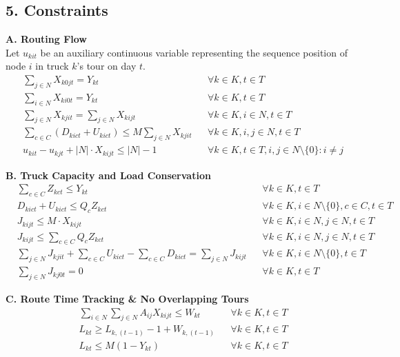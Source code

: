 \documentclass{article}
\begin{document}
\subsection*{5. Constraints}

\textbf{A. Routing Flow} \\
Let $u_{kit}$ be an auxiliary continuous variable representing the sequence position of node $i$ in truck $k$'s tour on day $t$.
\begin{align}
& \sum_{j \in N} X_{k0jt} = Y_{kt} && \forall k \in K, t \in T \label{eq:start} \\
& \sum_{i \in N} X_{ki0t} = Y_{kt} && \forall k \in K, t \in T \label{eq:return} \\
& \sum_{j \in N} X_{kjit} = \sum_{j \in N} X_{kijt} && \forall k \in K, i \in N, t \in T \label{eq:flow_balance} \\
& \sum_{c \in C} (D_{kict} + U_{kict}) \le M \sum_{j \in N} X_{kjit} && \forall k \in K, i, j \in N, t \in T \label{eq:action_lock} \\
& u_{kit} - u_{kjt} + |N| \cdot X_{kijt} \le |N| - 1 && \forall k \in K, t \in T, i, j \in N \setminus \{0\} : i \neq j \label{eq:mtz}
\end{align}

\textbf{B. Truck Capacity and Load Conservation}
\begin{align}
& \sum_{c \in C} Z_{kct} \le Y_{kt} && \forall k \in K, t \in T \label{eq:single_car_type} \\
& D_{kict} + U_{kict} \le Q_c Z_{kct} && \forall k \in K, i \in N \setminus \{0\}, c \in C, t \in T \label{eq:drop_assigned_type} \\
& J_{kijt} \le M \cdot X_{kijt} && \forall k \in K, i \in N, j \in N, t \in T \label{eq:load_active_arc} \\
& J_{kijt} \le \sum_{c \in C} Q_c Z_{kct} && \forall k \in K, i \in N, j \in N, t \in T \label{eq:max_capacity} \\
& \sum_{j \in N} J_{kjit} + \sum_{c \in C} U_{kict} - \sum_{c \in C} D_{kict} = \sum_{j \in N} J_{kijt} && \forall k \in K, i \in N \setminus \{0\}, t \in T \label{eq:load_balance} \\
& \sum_{j \in N} J_{kj0t} = 0 && \forall k \in K, t \in T \label{eq:empty_return}
\end{align}

\textbf{C. Route Time Tracking \& No Overlapping Tours}
\begin{align}
& \sum_{i \in N} \sum_{j \in N} A_{ij} X_{kijt} \le W_{kt} && \forall k \in K, t \in T \label{eq:tour_time} \\
& L_{kt} \ge L_{k, (t-1)} - 1 + W_{k, (t-1)} && \forall k \in K, t \in T \label{eq:lock_tracker} \\
& L_{kt} \le M (1 - Y_{kt}) && \forall k \in K, t \in T \label{eq:no_overlap}
\end{align}
\end{document}
